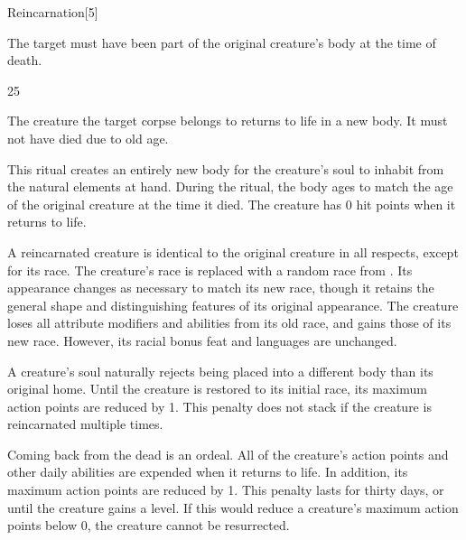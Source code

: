 \begin{spellsection}{Reincarnation}[5]

\begin{spellcontent}

\begin{spelltargetinginfo}
\spellspecial The target must have been part of the original creature's body at the time of death.

 25
\end{spelltargetinginfo}


\begin{spelleffects}



\spelleffect
The creature the target corpse belongs to returns to life in a new body.
It must not have died due to old age.

This ritual creates an entirely new body for the creature's soul to inhabit from the natural elements at hand.
During the ritual, the body ages to match the age of the original creature at the time it died.
The creature has 0 hit points when it returns to life.

A reincarnated creature is identical to the original creature in all respects, except for its race.
The creature's race is replaced with a random race from .
Its appearance changes as necessary to match its new race, though it retains the general shape and distinguishing features of its original appearance.
The creature loses all attribute modifiers and abilities from its old race, and gains those of its new race.
However, its racial bonus feat and languages are unchanged.

A creature's soul naturally rejects being placed into a different body than its original home.
Until the creature is restored to its initial race, its maximum action points are reduced by 1.
This penalty does not stack if the creature is reincarnated multiple times.

Coming back from the dead is an ordeal.
All of the creature's action points and other daily abilities are expended when it returns to life.
In addition, its maximum action points are reduced by 1.
This penalty lasts for thirty days, or until the creature gains a level.
If this would reduce a creature's maximum action points below 0, the creature cannot be resurrected.








\end{spelleffects}

\end{spellcontent}
\begin{spellfooter}


\end{spellfooter}
\begin{spellsubcontent}


\end{spellsubcontent}
\end{spellsection}


